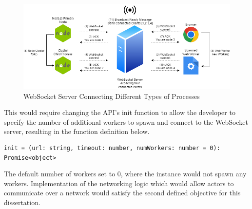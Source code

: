 \documentclass[oneside]{um-fict}
\begin{document}
\begin{figure}[H]
    \begin{centering}
        \includegraphics[width=\textwidth]{resources/websocketconnectioncomplex.png}
        \caption{WebSocket Server Connecting Different Types of Processes}
    \end{centering}
\end{figure}

This would require changing the API's init function to allow the developer to specify the number of additional workers to spawn and connect to the WebSocket server, resulting in the function definition below.
\begin{lstlisting}
init = (url: string, timeout: number, numWorkers: number = 0): Promise<object>
\end{lstlisting}
The default number of workers set to 0, where the instance would not spawn any workers. Implementation of the networking logic which would allow actors to communicate over a network would satisfy the second defined objective for this dissertation.
\end{document}
